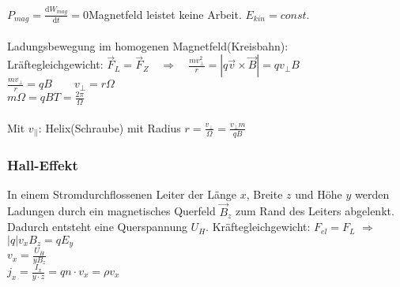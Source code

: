 \documentclass[10pt,a4paper]{scrartcl}
\begin{document}
$P_{mag}=\frac{\mathrm dW_{mag}}{\mathrm dt}=0$\qquad Magnetfeld leistet keine Arbeit. $E_{kin}=const.$\\
\\
Ladungsbewegung im homogenen Magnetfeld(Kreisbahn):\\
Lräftegleichgewicht: $\vec F_L=\vec F_Z \quad \Rightarrow \quad \frac{mv_{\perp}^2}{r}=|q\vec v \times \vec B|=qv_{\perp}B$\\
$\frac{mv_{\perp}}{r}=qB\qquad v_{\perp} =r\Omega$\\
$m\Omega=qB$\qquad $T=\frac{2\pi}{\Omega}$\\
\\
Mit $v_{||}$: Helix(Schraube) mit Radius $r=\frac{v_\perp}{\Omega}=\frac{v_\perp m}{q B}$

\subsubsection{Hall-Effekt} %
In einem Stromdurchflossenen Leiter der Länge $x$, Breite $z$ und Höhe $y$ werden Ladungen durch ein magnetisches Querfeld $\vec B_z$ zum Rand des Leiters abgelenkt. Dadurch entsteht eine Querspannung $U_H$.
Kräftegleichgewicht: $F_{el}=F_L$ \quad $\Rightarrow$ \quad $|q| v_x B_z = q E_y$\\
$v_x=\frac{U_H}{y B_z}$\\
$j_x=\frac{I_x}{y\cdot z}=qn\cdot v_x=\rho v_x$\\
\end{document}
